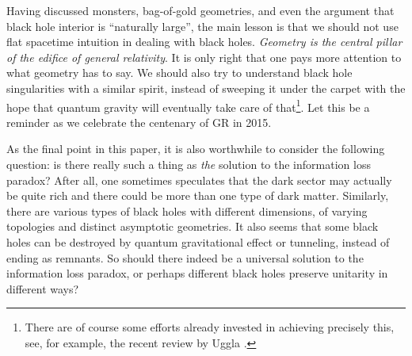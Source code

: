 \documentclass[12pt]{article}
\newcommand{\2}{$^2$}
\newcommand{\3}{$^3$}
\newcommand{\4}{$_4$}
\newcommand{\5}{$_5$}
\begin{document}

Having discussed monsters, bag-of-gold geometries, and even the argument that black hole interior is ``naturally large'', the main lesson is that we should not use flat spacetime intuition in dealing with black holes. \emph{Geometry is the central pillar of the edifice of general relativity}. It is only right that one pays more attention to what geometry has to say. 
We should also try to understand black hole singularities with a similar spirit, instead of sweeping it under the carpet with the hope that quantum gravity will eventually take care of that\footnote{\color{black}There  are of course some efforts already invested in achieving precisely this, see, for example, the recent review by Uggla \cite{1304.6905}.}.
Let this be a reminder as we celebrate the centenary of GR in 2015.

As the final point in this paper, it is also worthwhile to consider the following question: is there really such a thing as \emph{the} solution to the information loss paradox? After all, one sometimes speculates that the dark sector may actually be quite rich and there could be more than one type of dark matter. Similarly, there are various types of black holes with different dimensions, of varying topologies and distinct asymptotic geometries. It also seems that some black holes can be destroyed by quantum gravitational effect or tunneling, instead of ending as remnants. 
So should there indeed be a universal solution to the information loss paradox, or perhaps different black holes preserve unitarity in different ways? 
\end{document}
